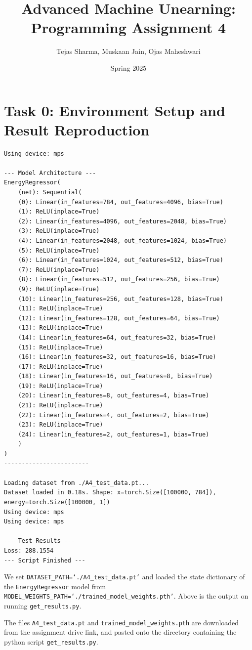 \documentclass{article}
\title{Advanced Machine Unearning: Programming Assignment 4}
\author{Tejas Sharma, Muskaan Jain, Ojas Maheshwari}
\date{Spring 2025}
\begin{document}
\maketitle
\section{Task 0: Environment Setup and Result Reproduction}
\begin{lstlisting}
Using device: mps

--- Model Architecture ---
EnergyRegressor(
    (net): Sequential(
    (0): Linear(in_features=784, out_features=4096, bias=True)
    (1): ReLU(inplace=True)
    (2): Linear(in_features=4096, out_features=2048, bias=True)
    (3): ReLU(inplace=True)
    (4): Linear(in_features=2048, out_features=1024, bias=True)
    (5): ReLU(inplace=True)
    (6): Linear(in_features=1024, out_features=512, bias=True)
    (7): ReLU(inplace=True)
    (8): Linear(in_features=512, out_features=256, bias=True)
    (9): ReLU(inplace=True)
    (10): Linear(in_features=256, out_features=128, bias=True)
    (11): ReLU(inplace=True)
    (12): Linear(in_features=128, out_features=64, bias=True)
    (13): ReLU(inplace=True)
    (14): Linear(in_features=64, out_features=32, bias=True)
    (15): ReLU(inplace=True)
    (16): Linear(in_features=32, out_features=16, bias=True)
    (17): ReLU(inplace=True)
    (18): Linear(in_features=16, out_features=8, bias=True)
    (19): ReLU(inplace=True)
    (20): Linear(in_features=8, out_features=4, bias=True)
    (21): ReLU(inplace=True)
    (22): Linear(in_features=4, out_features=2, bias=True)
    (23): ReLU(inplace=True)
    (24): Linear(in_features=2, out_features=1, bias=True)
    )
)
------------------------

Loading dataset from ./A4_test_data.pt...
Dataset loaded in 0.18s. Shape: x=torch.Size([100000, 784]), energy=torch.Size([100000, 1])
Using device: mps
Using device: mps

--- Test Results ---
Loss: 288.1554
--- Script Finished ---
\end{lstlisting}
We set \texttt{DATASET\_PATH=`./A4\_test\_data.pt'} and loaded the state dictionary of the \texttt{EnergyRegressor} model from \texttt{MODEL\_WEIGHTS\_PATH=`./trained\_model\_weights.pth'}. Above is the output on running \texttt{get\_results.py}.

The files \texttt{A4\_test\_data.pt} and \texttt{trained\_model\_weights.pth} are downloaded from the assignment drive link, and pasted onto the directory containing the python script \texttt{get\_results.py}.
\end{document}
